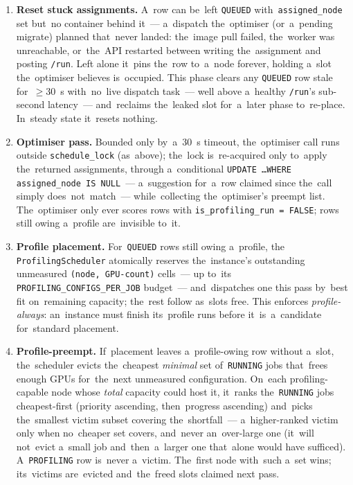 \begin{enumerate}[leftmargin=*,itemsep=2pt,topsep=4pt]
  \item \textbf{Reset stuck assignments.}
    A~row can be~left \texttt{QUEUED} with~\texttt{assigned\_node} set but~no
    container behind it~--- a~dispatch the~optimiser (or~a~pending migrate)
    planned that~never landed: the~image pull failed, the~worker was
    unreachable, or~the~API restarted between writing the~assignment and
    posting \texttt{/run}.  Left alone it~pins the~row to~a~node forever,
    holding a~slot the~optimiser believes is~occupied.  This phase clears any
    \texttt{QUEUED} row stale for~$\geq 30$~s with~no~live dispatch task~---
    well above a~healthy \texttt{/run}'s sub-second latency~--- and~reclaims
    the~leaked slot for~a~later phase to~re-place.  In~steady state it~resets
    nothing.
  \item \textbf{Optimiser pass.}
    Bounded only by~a~30~s timeout, the~optimiser call runs outside
    \texttt{schedule\_lock} (as~above); the~lock is~re-acquired only to~apply
    the~returned assignments, through a~conditional \texttt{UPDATE \ldots WHERE
    assigned\_node IS NULL}~--- a~suggestion for~a~row claimed since the~call
    simply does~not~match~--- while~collecting the~optimiser's preempt list.
    The~optimiser only ever scores rows with \texttt{is\_profiling\_run =
    FALSE}; rows still owing a~profile are~invisible to~it.
  \item \textbf{Profile placement.}
    For~\texttt{QUEUED} rows still owing a~profile, the
    \texttt{ProfilingScheduler} atomically reserves the~instance's outstanding
    unmeasured \texttt{(node, GPU-count)} cells~--- up to~its
    \texttt{PROFILING\_CONFIGS\_PER\_JOB} budget~--- and~dispatches one this
    pass by~best fit on~remaining capacity; the~rest follow as~slots free.
    This enforces \emph{profile-always}: an~instance must finish its~profile
    runs before it~is~a~candidate for~standard placement.
  \item \textbf{Profile-preempt.}
    If~placement leaves a~profile-owing row without a~slot, the~scheduler
    evicts the~cheapest \emph{minimal} set of~\texttt{RUNNING} jobs that~frees
    enough GPUs for~the~next unmeasured configuration.  On~each profiling-capable
    node whose \emph{total} capacity could host it, it~ranks the~\texttt{RUNNING}
    jobs cheapest-first (priority ascending, then~progress ascending) and~picks
    the~smallest victim subset covering the~shortfall~--- a~higher-ranked victim
    only when no~cheaper set covers, and~never an~over-large one (it~will
    not~evict a~small job and~then~a~larger one that~alone would have sufficed).
    A~\texttt{PROFILING} row is~never a~victim.  The~first node with~such a~set
    wins; its~victims are~evicted and~the~freed slots claimed next pass.
\end{enumerate}

